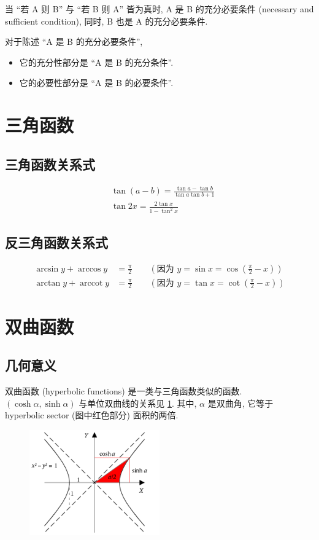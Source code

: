 \documentclass{book}
\DeclareMathOperator{\arccot}{arccot}
\numberwithin{equation}{section}
\numberwithin{figure}{section}
\theoremstyle{definition}
\newcommand{\dq}[1]{``#1''}
\begin{document}
当 \dq{若 A 则 B} 与 \dq{若 B 则 A} 皆为真时, A 是 B 的充分必要条件 (necessary and sufficient condition), 同时,  B 也是 A 的充分必要条件.

对于陈述 \dq{A 是 B 的充分必要条件}, 
\begin{itemize}
  \item 它的充分性部分是 \dq{A 是 B 的充分条件}.
  \item 它的必要性部分是 \dq{A 是 B 的必要条件}.
\end{itemize}


\section{三角函数}
\subsection{三角函数关系式}
\begin{align*}
  &\tan(a-b)=\frac{\tan a-\tan b}{\tan a\tan b+1}\\
  &\tan 2x=\frac{2\tan x}{1-\tan^2 x}
\end{align*}
\subsection{反三角函数关系式}
\begin{align*}
  \arcsin y+\arccos y&=\frac{\pi}{2}\qquad(\text{因为\ }y=\sin x=\cos(\frac{\pi}{2}-x))\\
  \arctan y+\arccot y&=\frac{\pi}{2}\qquad(\text{因为\ }y=\tan x=\cot(\frac{\pi}{2}-x))
\end{align*}
\section{双曲函数}
\subsection{几何意义}
双曲函数 (hyperbolic functions) 是一类与三角函数类似的函数.
$(\cosh\alpha,\sinh\alpha)$ 与单位双曲线的关系见 \cref{fig:hyperbolic_functions}. 其中, $\alpha$ 是双曲角, 它等于 hyperbolic sector (图中红色部分) 面积的两倍.
\begin{figure}[htb]
  \centering
  \includegraphics[width=0.5\textwidth]{files/hyperbolic_functions}
  \caption{}
  \label{fig:hyperbolic_functions}
\end{figure}
\end{document}
